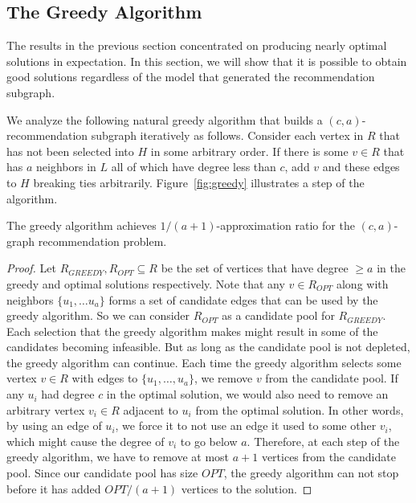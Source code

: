 \subsection{The Greedy Algorithm}
\label{greedy}
The results in the previous section concentrated on producing nearly
optimal solutions in expectation. In this section, we will show that
it is possible to obtain good solutions regardless of the model that
generated the recommendation subgraph. \vs

We analyze the following natural greedy algorithm
that builds a $(c,a)$-recommendation subgraph iteratively as follows. 
Consider each vertex in $R$ that has not been selected
into $H$ in some arbitrary order. If there is some $v \in R$ that has $a$ neighbors
in $L$ all of which have degree less than $c$, add $v$ and these edges to $H$ breaking
ties arbitrarily. Figure~\ref{fig:greedy} illustrates a step of the algorithm.

\begin{thm}
The greedy algorithm achieves $1/(a+1)$-approximation ratio for the $(c,a)$-graph
recommendation problem.
\end{thm}
\begin{proof}
Let $R_{GREEDY}, R_{OPT}\subseteq R$ be the set of vertices that have
degree $\geq a$ in the greedy and optimal solutions respectively. Note
that any $v \in R_{OPT}$ along with neighbors $\{u_1,\ldots u_a\}$
forms a set of candidate edges that can be used by the greedy
algorithm. So we can consider $R_{OPT}$ as a candidate pool for
$R_{GREEDY}$. Each selection that the greedy algorithm makes might result in
some of the candidates becoming infeasible. But as long as the candidate pool
is not depleted, the greedy algorithm can continue. 
Each time the greedy algorithm selects some vertex $v\in
R$ with edges to $\{u_1,\ldots, u_a\}$, we remove $v$ from the candidate pool. 
If any $u_i$ had degree $c$ in the optimal solution, we would also need to
remove an arbitrary vertex $v_i\in R$ adjacent to $u_i$ from the optimal
solution. In other words, by using an edge of $u_i$, we force it to
not use an edge it used to some other $v_i$, which might cause the
degree of $v_i$ to go below $a$. Therefore, at each step of
the greedy algorithm, we have to remove at most $a+1$ vertices from
the candidate pool. Since our candidate pool has size $OPT$, the
greedy algorithm can not stop before it has added $OPT/(a+1)$
vertices to the solution.
\end{proof}


